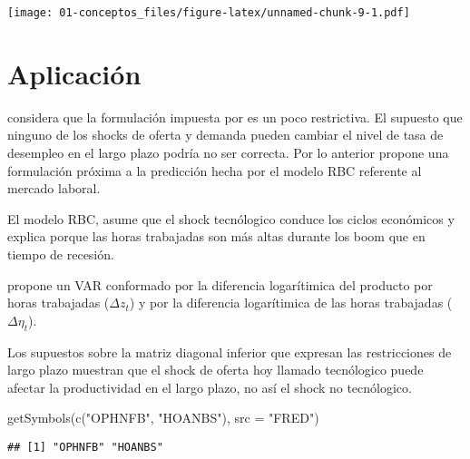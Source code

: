 \documentclass[
]{book}
\newenvironment{Shaded}{\begin{snugshade}}{\end{snugshade}}
\newcommand{\AttributeTok}[1]{\textcolor[rgb]{0.77,0.63,0.00}{#1}}
\newcommand{\FunctionTok}[1]{\textcolor[rgb]{0.00,0.00,0.00}{#1}}
\newcommand{\NormalTok}[1]{#1}
\newcommand{\StringTok}[1]{\textcolor[rgb]{0.31,0.60,0.02}{#1}}
\begin{document}
\texttt{[image: 01-conceptos\_files/figure-latex/unnamed-chunk-9-1.pdf]}

\hypertarget{aplicaciuxf3n-gali99}{%
\section{\texorpdfstring{Aplicación \citet{GALI99}}{Aplicación @GALI99}}\label{aplicaciuxf3n-gali99}}

\citet{GALI99} considera que la formulación impuesta por \citet{BLANCHARD88} es un poco restrictiva. El supuesto que ninguno de los shocks de oferta y demanda pueden cambiar el nivel de tasa de desempleo en el largo plazo podría no ser correcta. Por lo anterior propone una formulación próxima a la predicción hecha por el modelo RBC referente al mercado laboral.

El modelo RBC, asume que el shock tecnólogico conduce los ciclos económicos y explica porque las horas trabajadas son más altas durante los boom que en tiempo de recesión.

\citet{GALI99} propone un VAR conformado por la diferencia logarítimica del producto por horas trabajadas (\(\Delta z_{t}\)) y por la diferencia logarítimica de las horas trabajadas (\(\Delta \eta_{t}\)).

Los supuestos sobre la matriz diagonal inferior que expresan las restricciones de largo plazo muestran que el shock de oferta hoy llamado tecnólogico puede afectar la productividad en el largo plazo, no así el shock no tecnólogico.

\begin{Shaded}
\begin{Highlighting}[]
\FunctionTok{getSymbols}\NormalTok{(}\FunctionTok{c}\NormalTok{(}\StringTok{"OPHNFB"}\NormalTok{, }\StringTok{"HOANBS"}\NormalTok{),}
           \AttributeTok{src =} \StringTok{"FRED"}\NormalTok{)}
\end{Highlighting}
\end{Shaded}

\begin{verbatim}
## [1] "OPHNFB" "HOANBS"
\end{verbatim}
\end{document}
